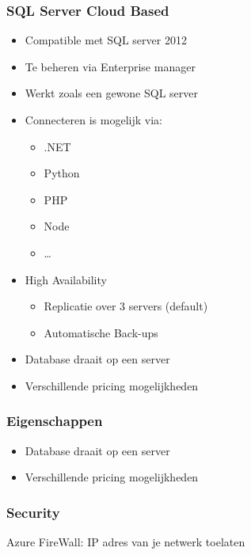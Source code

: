\documentclass{article}
\begin{document}
\subsubsection{SQL Server Cloud Based}
\begin{itemize}
    \item Compatible met SQL server 2012
    \item Te beheren via Enterprise manager
    \item Werkt zoals een gewone SQL server
    \item Connecteren is mogelijk via:
    \begin{itemize}
        \item .NET
        \item Python
        \item PHP
        \item Node
        \item \dots
    \end{itemize}
    \item High Availability
    \begin{itemize}
        \item Replicatie over 3 servers (default)
        \item Automatische Back-ups
    \end{itemize}
    \item Database draait op een server
    \item Verschillende pricing mogelijkheden
\end{itemize}

\subsubsection{Eigenschappen}
\begin{itemize}
    \item Database draait op een server
    \item Verschillende pricing mogelijkheden
\end{itemize}

\subsubsection{Security}
Azure FireWall: IP adres van je netwerk toelaten
\end{document}
